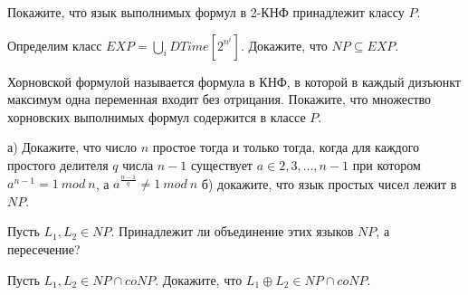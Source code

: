 \setcounter{curtask}{1}


\begin{task}
    Покажите, что язык выполнимых формул в 2-КНФ принадлежит классу $P$.
\end{task}

\begin{task}
    Определим класс $EXP = \bigcup\limits_{i}DTime[2^{n^i}]$. Докажите, что
    $NP \subseteq EXP$.
\end{task}

\begin{task}
    Хорновской формулой называется формула в КНФ, в которой в каждый дизъюнкт
    максимум одна переменная входит без отрицания. Покажите, что множество
    хорновских выполнимых формул содержится в классе $P$.
\end{task}

\begin{task}
    а) Докажите, что число $n$ простое тогда и только тогда, когда для каждого
    простого делителя $q$ числа $n - 1$ существует $a \in {2, 3, \dots, n - 1}$ при котором
    $a^{n - 1} = 1~mod~n$, а $a^{\frac{n - 1}{q}} \ne 1~mod~n$
    б) докажите, что язык простых чисел лежит в $NP$.
\end{task}

\begin{task}
    Пусть $L_1, L_2 \in NP$. Принадлежит ли объединение этих языков $NP$, а пересечение?
\end{task}

\begin{task}
    Пусть $L_1, L_2 \in NP \cap coNP$. Докажите, что $L_1 \oplus L_2 \in NP \cap coNP$.
\end{task}
